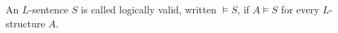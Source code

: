 An $L$-sentence $S$ is called logically valid, written $\vDash S$, if $A \vDash S$ for every $L$-structure $A$.
